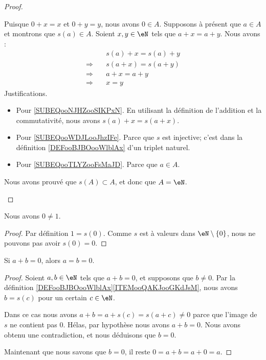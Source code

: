 \begin{proof}
\begin{subproof}
\begin{equation}
		\end{equation}
		Puisque \( 0+x=x\) et \( 0+y=y\), nous avons \( 0\in A\). Supposons à présent que \( a\in A\) et montrons que \( s(a)\in A\). Soient \( x,y\in \eN\) tels que \( a+x=a+y\). Nous avons :
		\begin{subequations}
			\begin{align}
				            & \quad s(a)+x=s(a)+y                                \\
				\Rightarrow & \quad s(a+x)=s(a+y)    \label{SUBEQooNJHZooSIKPxN} \\
				\Rightarrow & \quad a+x=a+y          \label{SUBEQooWDJLooJhzIFe} \\
				\Rightarrow & \quad x=y              \label{SUBEQooTLYZooFsMaJD}
			\end{align}
		\end{subequations}
		Justifications.
		\begin{itemize}
			\item Pour \eqref{SUBEQooNJHZooSIKPxN}. En utilisant la définition de l'addition et la commutativité, nous avons \( s(a)+x=s(a+x)\).
			\item Pour \eqref{SUBEQooWDJLooJhzIFe}. Parce que \( s\) est injective; c'est dans la définition \ref{DEFooBJBOooWlblAx} d'un triplet naturel.
			\item Pour \eqref{SUBEQooTLYZooFsMaJD}. Parce que \( a\in A\).
		\end{itemize}
		Nous avons prouvé que \( s(A)\subset A\), et donc que \( A=\eN\).
	\end{subproof}
\end{proof}

\begin{lemma}       \label{LEMooCOMSooEWrumL}
	Nous avons \( 0\neq 1\).
\end{lemma}

\begin{proof}
	Par définition \( 1=s(0)\). Comme \( s\) est à valeurs dans \( \eN\setminus\{ 0 \}\), nous ne pouvons pas avoir \( s(0)=0\).
\end{proof}

\begin{lemma}       \label{LEMooQBHFooCuCusQ}
	Si \( a+b=0\), alors \( a=b=0\).
\end{lemma}

\begin{proof}
	Soient \( a,b\in \eN\) tels que \( a+b=0\), et supposons que \( b\neq 0\). Par la définition \ref{DEFooBJBOooWlblAx}\ref{ITEMooQAKJooGKdJsM}, nous avons \( b=s(c)\) pour un certain \( c\in \eN\).

	Dans ce cas nous avons \( a+b=a+s(c)=s(a+c)\neq 0\) parce que l'image de \( s\) ne contient pas \( 0\). Hélas, par hypothèse nous avons \( a+b=0\). Nous avons obtenu une contradiction, et nous déduisons que \( b=0\).

	Maintenant que nous savons que \( b=0\), il reste \( 0=a+b=a+0=a\).
\end{proof}

